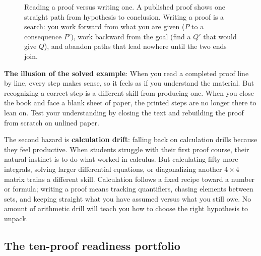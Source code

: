 \begin{figure}[htbp]
\caption{Reading a proof versus writing one. A published proof shows one straight path from hypothesis to conclusion. Writing a proof is a search: you work forward from what you are given ($P$ to a consequence $P'$), work backward from the goal (find a $Q'$ that would give $Q$), and abandon paths that lead nowhere until the two ends join.}
\label{26:fig-reading-vs-generation}
\end{figure}

\begin{trapbox}
\textbf{The illusion of the solved example}: When you read a completed proof line by line, every step makes sense, so it feels as if you understand the material. But recognizing a correct step is a different skill from producing one. When you close the book and face a blank sheet of paper, the printed steps are no longer there to lean on. Test your understanding by closing the text and rebuilding the proof from scratch on unlined paper.
\end{trapbox}

The second hazard is \textbf{calculation drift}: falling back on calculation drills because they feel productive. When students struggle with their first proof course, their natural instinct is to do what worked in calculus. But calculating fifty more integrals, solving larger differential equations, or diagonalizing another $4 \times 4$ matrix trains a different skill. Calculation follows a fixed recipe toward a number or formula; writing a proof means tracking quantifiers, chasing elements between sets, and keeping straight what you have assumed versus what you still owe. No amount of arithmetic drill will teach you how to choose the right hypothesis to unpack.

\subsection{The ten-proof readiness portfolio}
\label{26:sec-portfolio}

